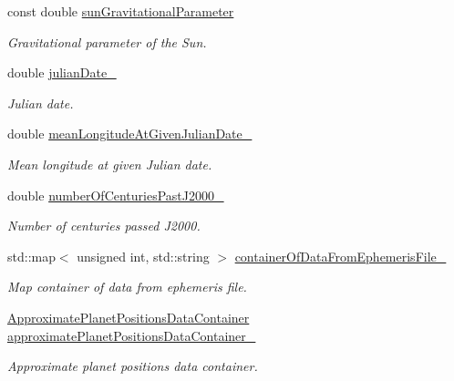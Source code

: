 \begin{DoxyCompactItemize}
\item 
const double \hyperlink{classtudat_1_1ephemerides_1_1ApproximatePlanetPositionsBase_a58b16732dcf7b19bda3810b455aca6bf}{sun\+Gravitational\+Parameter}
\begin{DoxyCompactList}\small\item\em Gravitational parameter of the Sun. \end{DoxyCompactList}\item 
double \hyperlink{classtudat_1_1ephemerides_1_1ApproximatePlanetPositionsBase_a6d6e4fdfb1666474b8e5647bfcf3746f}{julian\+Date\+\_\+}
\begin{DoxyCompactList}\small\item\em Julian date. \end{DoxyCompactList}\item 
double \hyperlink{classtudat_1_1ephemerides_1_1ApproximatePlanetPositionsBase_ad63ef8202dfe8a0a04feb350344ee7e7}{mean\+Longitude\+At\+Given\+Julian\+Date\+\_\+}
\begin{DoxyCompactList}\small\item\em Mean longitude at given Julian date. \end{DoxyCompactList}\item 
double \hyperlink{classtudat_1_1ephemerides_1_1ApproximatePlanetPositionsBase_aa967cb9533b467af0cf22d5bb5ed8501}{number\+Of\+Centuries\+Past\+J2000\+\_\+}
\begin{DoxyCompactList}\small\item\em Number of centuries passed J2000. \end{DoxyCompactList}\item 
std\+::map$<$ unsigned int, std\+::string $>$ \hyperlink{classtudat_1_1ephemerides_1_1ApproximatePlanetPositionsBase_acfc0c1fc4289411b5d90d1fae6058629}{container\+Of\+Data\+From\+Ephemeris\+File\+\_\+}
\begin{DoxyCompactList}\small\item\em Map container of data from ephemeris file. \end{DoxyCompactList}\item 
\hyperlink{structtudat_1_1ephemerides_1_1ApproximatePlanetPositionsDataContainer}{Approximate\+Planet\+Positions\+Data\+Container} \hyperlink{classtudat_1_1ephemerides_1_1ApproximatePlanetPositionsBase_a04dafb484427c3a552fb4a7f6f456ea0}{approximate\+Planet\+Positions\+Data\+Container\+\_\+}
\begin{DoxyCompactList}\small\item\em Approximate planet positions data container. \end{DoxyCompactList}\item 

\end{DoxyCompactItemize}
